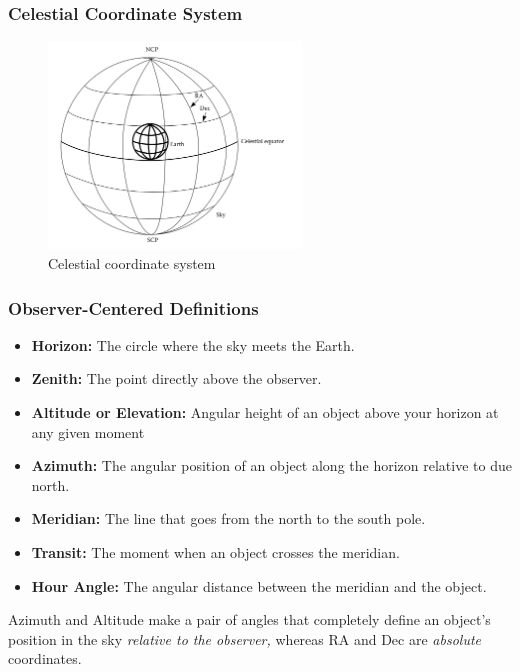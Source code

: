 \documentclass[handout, %
	11pt, %
]{beamer}
\begin{document}
\begin{frame}
    \frametitle{Celestial Coordinate System}
    \begin{figure}
        \centering
        \includegraphics[width=0.6\textwidth]{Images/celestial_coordinate_system.png}
        \caption{Celestial coordinate system}
        \label{fig:celestial_coordinates}
    \end{figure}
\end{frame}

\begin{frame}
    \frametitle{Observer-Centered Definitions}
    \begin{itemize}
        \item \textbf{Horizon:} The circle where the sky meets the Earth.
        \item \textbf{Zenith:} The point directly above the observer.
        \item \textbf{Altitude or Elevation:} Angular height of an object above your horizon at any given moment
        \item \textbf{Azimuth:} The angular position of an object along the horizon relative to due north.
        \item \textbf{Meridian:} The line that goes from the north to the south pole.
        \item \textbf{Transit:} The moment when an object crosses the meridian.
        \item \textbf{Hour Angle:} The angular distance between the meridian and the object.
    \end{itemize}

    Azimuth and Altitude make a pair of angles that completely define an object’s position in the sky \textit{relative to the observer,} whereas RA and Dec are \textit{absolute} coordinates.
\end{frame}
\end{document}
